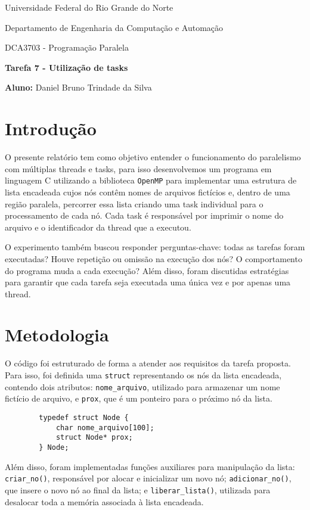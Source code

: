 \documentclass[a4paper, 12pt]{article}
\begin{document}
	\begin{center}
		Universidade Federal do Rio Grande do Norte
		
		Departamento de Engenharia da Computação e Automação
		
		DCA3703 - Programação Paralela
		
		\textbf{Tarefa 7 - Utilização de tasks}
		
		\textbf{Aluno:} Daniel Bruno Trindade da Silva
	\end{center}
	
	\section{Introdução}
	\hspace{.7cm}O presente relatório tem como objetivo entender o funcionamento do paralelismo com múltiplas threads e tasks, para isso desenvolvemos um programa em linguagem C utilizando a biblioteca \texttt{OpenMP} para implementar uma estrutura de lista encadeada cujos nós contêm nomes de arquivos fictícios e, dentro de uma região paralela, percorrer essa lista criando uma task individual para o processamento de cada nó. Cada task é responsável por imprimir o nome do arquivo e o identificador da thread que a executou.
	
	O experimento também buscou responder perguntas-chave: todas as tarefas foram executadas? Houve repetição ou omissão na execução dos nós? O comportamento do programa muda a cada execução? Além disso, foram discutidas estratégias para garantir que cada tarefa seja executada uma única vez e por apenas uma thread.
	
	\section{Metodologia}
	\hspace{0.7cm}O código foi estruturado de forma a atender aos requisitos da tarefa proposta. Para isso, foi definida uma \texttt{struct} representando os nós da lista encadeada, contendo dois atributos: \texttt{nome\_arquivo}, utilizado para armazenar um nome fictício de arquivo, e \texttt{prox}, que é um ponteiro para o próximo nó da lista.
	
	\begin{verbatim}
		typedef struct Node {
			char nome_arquivo[100];
			struct Node* prox;
		} Node;
	\end{verbatim}
	
	Além disso, foram implementadas funções auxiliares para manipulação da lista: \texttt{criar\_no()}, responsável por alocar e inicializar um novo nó; \texttt{adicionar\_no()}, que insere o novo nó ao final da lista; e \texttt{liberar\_lista()}, utilizada para desalocar toda a memória associada à lista encadeada.
	
\end{document}
